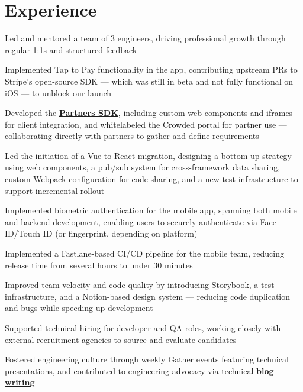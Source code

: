 \documentclass[]{plushcv}
\begin{document}
\begin{minipage}[t]{0.70\textwidth}
\section{Experience}
\vspace{\topsep} %
\begin{tightemize}
\sectionsep
\item Led and mentored a team of 3 engineers, driving professional growth through regular 1:1s and structured feedback
\item Implemented Tap to Pay functionality in the app, contributing upstream PRs to Stripe's open-source SDK — which was still in beta and not fully functional on iOS — to unblock our launch 
\item Developed the \href{https://developer.crowdedfinance.com/}{\textbf{Partners SDK}}, including custom web components and iframes for client integration, and whitelabeled the Crowded portal for partner use — collaborating directly with partners to gather and define requirements  
\item Led the initiation of a Vue-to-React migration, designing a bottom-up strategy using web components, a pub/sub system for cross-framework data sharing, custom Webpack configuration for code sharing, and a new test infrastructure to support incremental rollout
\item Implemented biometric authentication for the mobile app, spanning both mobile and backend development, enabling users to securely authenticate via Face ID/Touch ID (or fingerprint, depending on platform)
\item Implemented a Fastlane-based CI/CD pipeline for the mobile team, reducing release time from several hours to under 30 minutes
\item Improved team velocity and code quality by introducing Storybook, a test infrastructure, and a Notion-based design system — reducing code duplication and bugs while speeding up development
\item Supported technical hiring for developer and QA roles, working closely with external recruitment agencies to source and evaluate candidates
\item Fostered engineering culture through weekly Gather events featuring technical presentations, and contributed to engineering advocacy via technical \href{https://medium.com/crowdedbanking/predicting-user-behavior-correcting-user-inputs-with-levenshtein-distance-f2a3e707e844}{\textbf{blog writing}}
\end{tightemize}
\sectionsep


\end{minipage}
\end{document}
